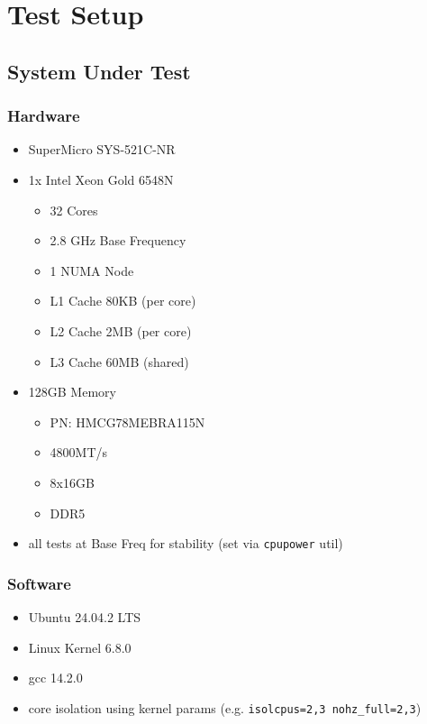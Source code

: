 \section{Test Setup}
\subsection{System Under Test}
\subsubsection{Hardware}
\begin{itemize}
    \item SuperMicro SYS-521C-NR
    \item 1x Intel Xeon Gold 6548N
        \begin{itemize}
            \item 32 Cores
            \item 2.8 GHz Base Frequency
            \item 1 NUMA Node
            \item L1 Cache 80KB (per core)
            \item L2 Cache 2MB (per core)
            \item L3 Cache 60MB (shared)
        \end{itemize}
    \item 128GB Memory
        \begin{itemize}
            \item PN: HMCG78MEBRA115N
            \item 4800MT/s
            \item 8x16GB
            \item DDR5
        \end{itemize}
    \item all tests at Base Freq for stability (set via \texttt{cpupower} util)
\end{itemize}

\subsubsection{Software}
\begin{itemize}
    \item Ubuntu 24.04.2 LTS
    \item Linux Kernel 6.8.0
    \item gcc 14.2.0
    \item core isolation using kernel params (e.g. \texttt{isolcpus=2,3 nohz\_full=2,3})
\end{itemize}

